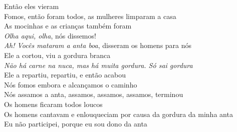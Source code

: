 \bigskip

\begin{linenumbers}\begingroup\raggedright
 
\noindent   Então eles vieram\\
  Fomos, então foram todos, as mulheres limparam a casa\\
  As mocinhas e as crianças também foram\\
  \emph{Olha aqui, olha}, nós dissemos!\\
  \emph{Ah! Vocês mataram a anta boa}, disseram os homens para nós\\
  Ele a cortou, viu a gordura branca\\
  \emph{Não há carne na nuca, mas há muita gordura. Só sai gordura}\\
  Ele a repartiu, repartiu, e então acabou\\
  Nós fomos embora e alcançamos o caminho\\
  Nós assamos a anta, assamos, assamos, assamos, terminou\\
  Os homens ficaram todos loucos\\
  Os homens cantavam e enlouqueciam por causa da gordura da minha anta\\
  Eu não participei, porque eu sou dono da anta
 
\end{linenumbers}\endgroup

\bigskip

